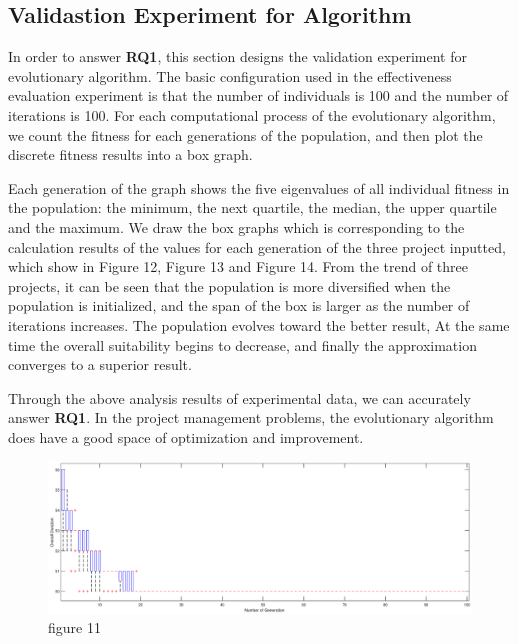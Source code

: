 \subsection{Validastion Experiment for Algorithm}
%
In order to answer \textbf{RQ1}, this section designs the validation experiment for 
evolutionary algorithm. The basic configuration used in the effectiveness 
evaluation experiment is that the number of individuals is 100 and the number 
of iterations is 100. For each computational 
process of the evolutionary algorithm, we count the fitness for each 
generations of the population, and then plot the discrete fitness results 
into a box graph.


Each generation of the graph shows the five eigenvalues of all individual 
fitness in the population: the minimum, the next quartile, the median, the 
upper quartile and the maximum. We draw the box graphs which is corresponding 
to the calculation results of the values for each generation of the three 
project inputted, which show in Figure 12, Figure 13 and Figure 14. From the 
trend of three projects, it can be seen that the population is more 
diversified when the population is initialized, and the span of the box is 
larger as the number of iterations increases. The population evolves toward 
the better result, At the same time the overall suitability begins to 
decrease, and finally the approximation converges to a superior result.


Through the above analysis results of experimental data, we can accurately 
answer \textbf{RQ1}. In the project management problems, the evolutionary algorithm does 
have a good space of optimization and improvement.

\begin{figure}[ht]
  \centering
  \includegraphics[width=\textwidth]{figures/fig_pa1.eps}
  \caption{figure 11}
  \label{fig:label}
\end{figure}







